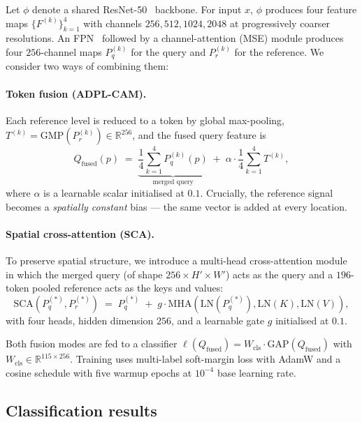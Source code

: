 \documentclass[11pt,a4paper]{article}
\begin{document}
Let $\phi$ denote a shared ResNet-50~\citep{resnet} backbone. For input
$x$, $\phi$ produces four feature maps
$\{F^{(k)}\}_{k=1}^{4}$ with channels $256,512,1024,2048$ at progressively
coarser resolutions. An FPN~\citep{fpn} followed by a channel-attention
(MSE) module produces four $256$-channel maps
$P^{(k)}_q$ for the query and $P^{(k)}_r$ for the reference. We consider
two ways of combining them:

\paragraph{Token fusion (ADPL-CAM).}
Each reference level is reduced to a token by global max-pooling,
$T^{(k)}\!=\!\mathrm{GMP}(P^{(k)}_r)\in\mathbb{R}^{256}$, and the fused
query feature is
\begin{equation}
Q_{\mathrm{fused}}(p)
\;=\;\underbrace{\frac{1}{4}\sum_{k=1}^{4}P^{(k)}_q(p)}_{\text{merged query}}
\;+\;\alpha\cdot\frac{1}{4}\sum_{k=1}^{4}T^{(k)},
\label{eq:adpl}
\end{equation}
where $\alpha$ is a learnable scalar initialised at $0.1$.
Crucially, the reference signal becomes a \emph{spatially constant}
bias — the same vector is added at every location.

\paragraph{Spatial cross-attention (SCA).}
To preserve spatial structure, we introduce a multi-head cross-attention
module in which the merged query (of shape $256\times H'\!\times\! W'$)
acts as the query and a $196$-token pooled reference acts as the keys
and values:
\begin{equation}
\mathrm{SCA}(P^{(*)}_q,P^{(*)}_r) \;=\; P^{(*)}_q \;+\;
g\cdot \mathrm{MHA}\!\left(\mathrm{LN}(P^{(*)}_q), \mathrm{LN}(K), \mathrm{LN}(V)\right),
\label{eq:sca}
\end{equation}
with four heads, hidden dimension $256$, and a learnable gate $g$
initialised at $0.1$.

Both fusion modes are fed to a classifier
$\ell(Q_{\mathrm{fused}})=W_{\mathrm{cls}}\cdot\mathrm{GAP}(Q_{\mathrm{fused}})$
with $W_{\mathrm{cls}}\in\mathbb{R}^{115\times256}$. Training uses
multi-label soft-margin loss with AdamW and a cosine schedule with five
warmup epochs at $10^{-4}$ base learning rate.

\subsection{Classification results}
\end{document}
